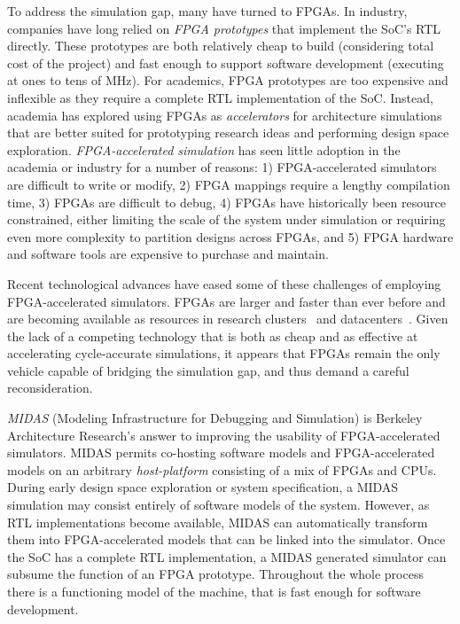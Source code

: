 To address the simulation gap, many have turned to FPGAs. In industry,
companies have long relied on \emph{FPGA prototypes} that implement the SoC's
RTL directly. These prototypes are both relatively cheap to build (considering
total cost of the project) and fast enough to support software development
(executing at ones to tens of MHz). For academics, FPGA prototypes are too
expensive and inflexible as they require a complete RTL implementation of the
SoC. Instead, academia has explored using FPGAs as \emph{accelerators} for
architecture simulations~\cite{fast, fame, hasim, protoflex,ramp} that are
better suited for prototyping research ideas and performing design space
exploration. \emph{FPGA-accelerated simulation} has seen little adoption in the
academia or industry for a number of reasons: 1) FPGA-accelerated simulators
are difficult to write or modify, 2) FPGA mappings require a lengthy
compilation time, 3) FPGAs are difficult to debug, 4) FPGAs have historically
been resource constrained, either limiting the scale of the system under
simulation or requiring even more complexity to partition designs across FPGAs,
and 5) FPGA hardware and software tools are expensive to purchase and maintain.

Recent technological advances have eased some of these challenges of employing
FPGA-accelerated simulators. FPGAs are larger and faster than ever before and
are becoming available as resources in research clusters~\cite{catapultannounce}
and datacenters~\cite{amazonf1}.  Given the lack of a competing technology that
is both as cheap and as effective at accelerating cycle-accurate simulations,
it appears that FPGAs remain the only vehicle capable of bridging the
simulation gap, and thus demand a careful reconsideration.

\emph{MIDAS} (Modeling Infrastructure for Debugging and Simulation) is Berkeley
Architecture Research's answer to improving the usability of FPGA-accelerated
simulators. MIDAS permits co-hosting software models and FPGA-accelerated
models on an arbitrary \emph{host-platform} consisting of a mix of FPGAs and
CPUs.  During early design space exploration or system specification, a MIDAS
simulation may consist entirely of software models of the system.  However, as
RTL implementations become available, MIDAS can automatically transform them
into FPGA-accelerated models that can be linked into the simulator. Once the
SoC has a complete RTL implementation, a MIDAS generated simulator can subsume
the function of an FPGA prototype. Throughout the whole process there is a
functioning model of the machine, that is fast enough for software development.

